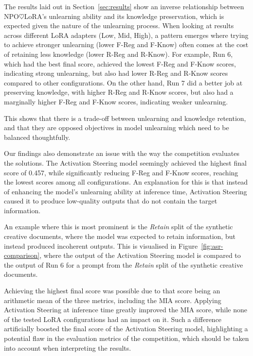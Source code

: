 \documentclass[10pt, a4paper]{article}
\begin{document}
The results laid out in Section~\ref{sec:results} show an inverse relationship between NPO$\heartsuit$LoRA's unlearning ability and its knowledge preservation, which is expected given the nature of the unlearning process. When looking at results across different LoRA adapters (Low, Mid, High), a pattern emerges where trying to achieve stronger unlearning (lower F-Reg and F-Know) often comes at the cost of retaining less knowledge (lower R-Reg and R-Know). For example, Run 6, which had the best final score, achieved the lowest F-Reg and F-Know scores, indicating strong unlearning, but also had lower R-Reg and R-Know scores compared to other configurations. On the other hand, Run 7 did a better job at preserving knowledge, with higher R-Reg and R-Know scores, but also had a marginally higher F-Reg and F-Know scores, indicating weaker unlearning.

This shows that there is a trade-off between unlearning and knowledge retention, and that they are opposed objectives in model unlearning which need to be balanced thoughtfully.

Our findings also demonstrate an issue with the way the competition evaluates the solutions. The Activation Steering model seemingly achieved the highest final score of 0.457, while significantly reducing F-Reg and F-Know scores, reaching the lowest scores among all configurations. An explanation for this is that instead of enhancing the model's unlearning ability at inference time, Activation Steering caused it to produce low-quality outputs that do not contain the target information.

An example where this is most prominent is the \textit{Retain} split of the synthetic creative documents, where the model was expected to retain information, but instead produced incoherent outputs. This is visualised in Figure~\ref{fig:asr-comparison}, where the output of the Activation Steering model is compared to the output of Run 6 for a prompt from the \textit{Retain} split of the synthetic creative documents.

Achieving the highest final score was possible due to that score being an arithmetic mean of the three metrics, including the MIA score. Applying Activation Steering at inference time greatly improved the MIA score, while none of the tested LoRA configurations had an impact on it. Such a difference artificially boosted the final score of the Activation Steering model, highlighting a potential flaw in the evaluation metrics of the competition, which should be taken into account when interpreting the results.
\end{document}
